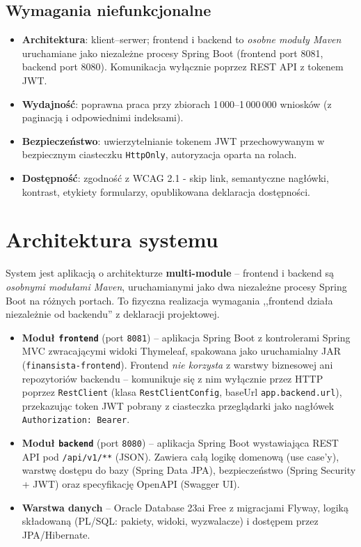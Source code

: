 \documentclass[12pt,a4paper]{article}
\begin{document}
\subsection{Wymagania niefunkcjonalne}
\begin{itemize}[leftmargin=*]
  \item \textbf{Architektura}: klient--serwer; frontend i backend to
        \emph{osobne moduły Maven} uruchamiane jako niezależne procesy
        Spring Boot (frontend port 8081, backend port 8080). Komunikacja
        wyłącznie poprzez REST API z tokenem JWT.
  \item \textbf{Wydajność}: poprawna praca przy zbiorach 1\,000--1\,000\,000 wniosków
        (z paginacją i odpowiednimi indeksami).
  \item \textbf{Bezpieczeństwo}: uwierzytelnianie tokenem JWT przechowywanym w bezpiecznym
        ciasteczku \texttt{HttpOnly}, autoryzacja oparta na rolach.
  \item \textbf{Dostępność}: zgodność z WCAG 2.1 - skip link, semantyczne nagłówki,
        kontrast, etykiety formularzy, opublikowana deklaracja dostępności.
\end{itemize}


\section{Architektura systemu}
\label{sec:architektura}

System jest aplikacją o architekturze \textbf{multi-module} -- frontend
i backend są \emph{osobnymi modułami Maven}, uruchamianymi jako dwa
niezależne procesy Spring Boot na różnych portach. To fizyczna realizacja
wymagania ,,frontend działa niezależnie od backendu'' z deklaracji projektowej.

\begin{itemize}[leftmargin=*]
  \item \textbf{Moduł \texttt{frontend}} (port \texttt{8081}) -- aplikacja
        Spring Boot z kontrolerami Spring MVC zwracającymi widoki Thymeleaf,
        spakowana jako uruchamialny JAR (\texttt{finansista-frontend}).
        Frontend \emph{nie korzysta} z warstwy biznesowej ani repozytoriów
        backendu -- komunikuje się z nim wyłącznie przez HTTP poprzez
        \texttt{RestClient} (klasa \texttt{RestClientConfig}, baseUrl
        \texttt{app.backend.url}), przekazując token JWT pobrany z ciasteczka
        przeglądarki jako nagłówek \texttt{Authorization: Bearer}.
  \item \textbf{Moduł \texttt{backend}} (port \texttt{8080}) -- aplikacja
        Spring Boot wystawiająca REST API pod \texttt{/api/v1/**} (JSON).
        Zawiera całą logikę domenową (use case'y), warstwę dostępu do bazy
        (Spring Data JPA), bezpieczeństwo (Spring Security + JWT) oraz
        specyfikację OpenAPI (Swagger UI).
  \item \textbf{Warstwa danych} -- Oracle Database 23ai Free z migracjami
        Flyway, logiką składowaną (PL/SQL: pakiety, widoki, wyzwalacze)
        i dostępem przez JPA/Hibernate.
\end{itemize}
\end{document}
